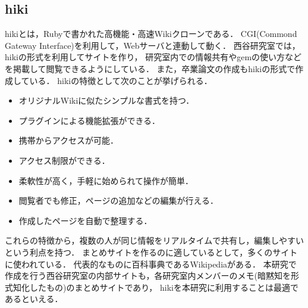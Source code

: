 \subsection{hiki}
hikiとは，Rubyで書かれた高機能・高速Wikiクローンである\cite{d}．
CGI(Commond Gateway Interface)を利用して，Webサーバと連動して動く\cite{e}．
西谷研究室では，hikiの形式を利用してサイトを作り，
研究室内での情報共有やgemの使い方などを掲載して閲覧できるようにしている．
また，卒業論文の作成もhikiの形式で作成している．
hikiの特徴として次のことが挙げられる．
\begin{itemize}
\item オリジナルWikiに似たシンプルな書式を持つ．
\item プラグインによる機能拡張ができる\cite{f}．
\item 携帯からアクセスが可能．
\item アクセス制限ができる．
\item 柔軟性が高く，手軽に始められて操作が簡単\cite{g}．
\item 閲覧者でも修正，ページの追加などの編集が行える．
\item 作成したページを自動で整理する\cite{h}．
\end{itemize}
これらの特徴から，複数の人が同じ情報をリアルタイムで共有し，編集しやすいという利点を持つ．
まとめサイトを作るのに適しているとして，多くのサイトに使われている．
代表的なものに百科事典であるWikipediaがある．
本研究で作成を行う西谷研究室の内部サイトも，各研究室内メンバーのメモ(暗黙知を形式知化したもの)のまとめサイトであり，
hikiを本研究に利用することは最適であるといえる．